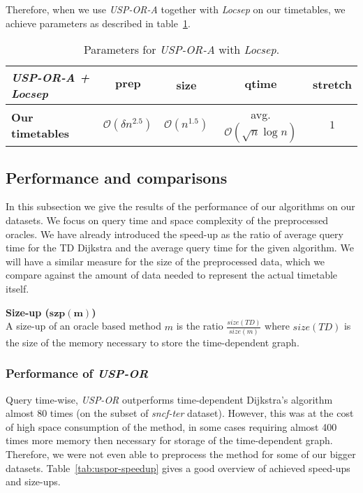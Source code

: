 		\noindent Therefore, when we use \textit{USP-OR-A} together with \textit{Locsep} on our timetables, we achieve parameters as described in table~\ref{tab:usporalocsep}.
		
		\begin{table}[h!]
			\centering
			\begin{tabular}{l|c|c|c|c}
				\cellcolor{oracle-clr} \textit{\textbf{USP-OR-A + Locsep}} & \cellcolor{oracle-clr} $\bm{prep}$ & \cellcolor{oracle-clr} $\bm{size}$ & \cellcolor{oracle-clr} $\bm{qtime}$ & \cellcolor{oracle-clr} $\bm{stretch}$ \\
				\hline
				\cellcolor{oracle-clr} \textbf{Our timetables} & $\mathcal{O}(\delta n^{2.5})$ & $\mathcal{O}(n^{1.5})$ & avg. $\mathcal{O}(\sqrt{n} \log n)$ & $1$ \\
			\end{tabular}
			\caption{\label{tab:usporalocsep} Parameters for \textit{USP-OR-A} with \textit{Locsep}.}
		\end{table}
	
\subsection{Performance and comparisons}

	\noindent In this subsection we give the results of the performance of our algorithms on our datasets. We focus on query time and space complexity of the preprocessed oracles. We have already introduced the speed-up as the ratio of average query time for the TD Dijkstra and the average query time for the given algorithm. We will have a similar measure for the size of the preprocessed data, which we compare against the amount of data needed to represent the actual timetable itself.
	
	\begin{definition}
		\textbf{Size-up ($\bm{szp(m)}$)}\\
		A size-up of an oracle based method $m$ is the ratio $\frac{\displaystyle size(TD)}{\displaystyle size(m)}$ where $size(TD)$ is the size of the memory necessary to store the time-dependent graph.
	\end{definition}

	\subsubsection{Performance of \textit{USP-OR}}
		
		Query time-wise, \textit{USP-OR} outperforms time-dependent Dijkstra's algorithm almost 80 times (on the subset of \textit{sncf-ter} dataset). However, this was at the cost of high space consumption of the method, in some cases requiring almost 400 times more memory then necessary for storage of the time-dependent graph. Therefore, we were not even able to preprocess the method for some of our bigger datasets. Table~\ref{tab:uspor-speedup} gives a good overview of achieved speed-ups and size-ups.
	
